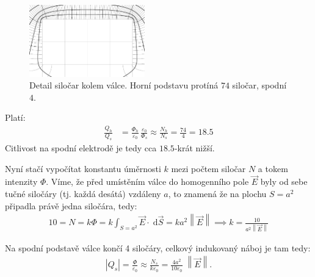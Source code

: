 \documentclass[10pt,a4paper]{article}
\newcommand{\const}[1]{\text{#1}}
\newcommand{\norm}[1]{\left\lVert#1\right\rVert}
\renewcommand{\d}[1]{\;\const{d}#1}
\begin{document}
\begin{figure}
    \centering
    \includegraphics[width=5cm]{uloha3_detail.pdf}
    \caption{Detail siločar kolem válce. Horní podstavu protíná $74$ siločar, spodní $4$.}
\end{figure}

Platí:
\begin{align*}
    \frac{Q_h}{Q_s} &= \frac{\Phi_h}{\varepsilon_0} \, \frac{\varepsilon_0}{\Phi_s} \approx \frac{N_h}{N_s} = \frac{74}{4} = 18.5
\end{align*}
Citlivost na spodní elektrodě je tedy cca $18.5$-krát nižší.

Nyní stačí vypočítat konstantu úměrnosti $k$ mezi počtem siločar $N$ a tokem intenzity $\Phi$. Víme, že před umístěním válce do homogenního pole $\vec{E}$ byly od sebe tučné siločáry (tj. každá desátá) vzdáleny $a$, to znamená že na plochu $S=a^2$ připadla právě jedna siločára, tedy:
\begin{align*}
    10 = N = k\Phi = k\int_{S=a^2} \vec{E} \cdot \d{\vec{S}} = k a^2 \norm{\vec{E}} \implies k = \frac{10}{a^2 \norm{\vec{E}}}
\end{align*}

Na spodní podstavě válce končí 4 siločáry, celkový indukovaný náboj je tam tedy:
\begin{align*}
    \left|Q_s\right|
    = \frac{\Phi}{\varepsilon_0}
    \approx \frac{N_s}{k\varepsilon_0}
    = \frac{4 a^2}{10 \varepsilon_0} \; \norm{\vec{E}}.
\end{align*}
\end{document}
